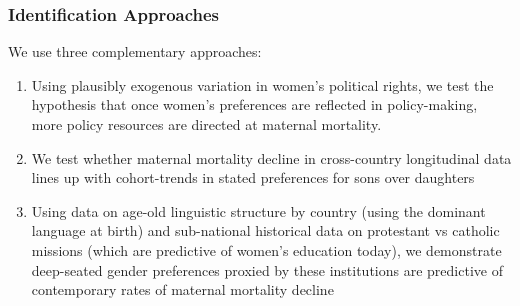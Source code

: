 \documentclass[10pt,letterpaper,subeqn]{beamer}
\begin{document}
\begin{frame}
  \frametitle{Identification Approaches}
  We use three complementary approaches: \vspace{3mm}
  \begin{enumerate}
  \item   Using plausibly exogenous variation in women's political rights, we test the hypothesis that once women's preferences are reflected in policy-making, more policy resources are directed at maternal mortality.

  \item   We test whether maternal mortality decline in cross-country longitudinal data lines up with cohort-trends in stated preferences for sons over daughters

  \item   Using data on age-old linguistic structure by country (using the dominant language at birth) and sub-national historical data on protestant vs catholic missions (which are predictive of women's education today), we demonstrate deep-seated gender preferences proxied by these institutions are predictive of contemporary rates of maternal mortality decline
  \end{enumerate}
\end{frame}
\end{document}
